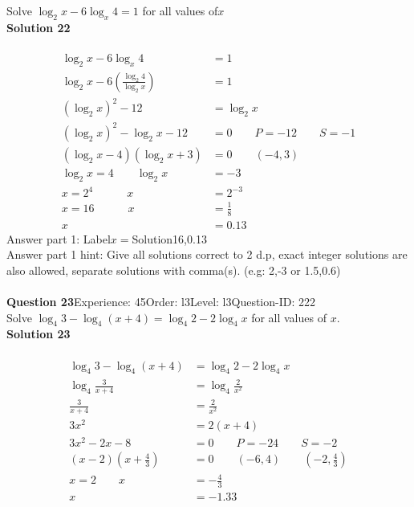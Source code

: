 \documentclass{article}
\begin{document}
Solve $\log_{2}x-6\log_{x}4=1$ for all values of$x$\\[4pt]
\noindent\textbf{Solution 22}\\[2pt]
\\[-35pt]\begin{align*}
\log_{2}x-6\log_{x}4&=1\\[2pt]
\log_{2}x-6\left(\displaystyle\frac{\log_{2}4}{\log_{2}x}\right)&=1\\[2pt]
(\log_{2}x)^2-12&=\log_{2}x\\[2pt]
(\log_{2}x)^2-\log_{2}x-12&=0\qquad P=-12 \qquad S=-1\\[2pt]
(\log_{2}x-4)(\log_{2}x+3)&=0\qquad (-4,3)\\[2pt]
\log_{2}x=4 \qquad \log_{2}x&=-3\\[2pt]
x=2^4 \hspace{36pt} x&=2^{-3}\\[2pt]
x=16 \hspace{36pt} x&=\displaystyle\frac{1}{8}\\[2pt]
x&=0.13
\end{align*}
Answer part 1: \hspace{10pt}Label\hspace{10pt}$x=$\hspace{10pt}Solution\hspace{10pt}16,0.13\\
Answer part 1 hint: \hspace{15pt}Give all solutions correct to 2 d.p, exact integer solutions are also allowed, separate solutions with comma(s). (e.g: 2,-3 or 1.5,0.6)\\
\\[4pt]
\noindent\textbf{Question 23}\hspace{20pt}Experience: 45\hspace{20pt}Order: l3\hspace{20pt}Level: l3\hspace{20pt}Question-ID: 222\\[2pt]
Solve $\log_{4}3-\log_{4}(x+4)=\log_{4}2-2\log_{4}x$ for all values of $x$.\\[4pt]
\noindent\textbf{Solution 23}\\[2pt]
\\[-35pt]\begin{align*}
\log_{4}3-\log_{4}(x+4)&=\log_{4}2-2\log_{4}x\\[2pt]
\log_{4}\displaystyle\frac{3}{x+4}&=\log_{4}\displaystyle\frac{2}{x^2}\\[2pt]
\displaystyle\frac{3}{x+4}&=\displaystyle\frac{2}{x^2}\\[2pt]
3x^2&=2(x+4)\\[2pt]
3x^2-2x-8&=0\qquad P=-24\qquad S=-2\\[2pt]
(x-2)\left(x+\displaystyle\frac{4}{3}\right)&=0\qquad (-6,4)\qquad \left(-2,\displaystyle\frac{4}{3}\right)\\[2pt]
x=2\qquad x&=-\displaystyle\frac{4}{3}\\[2pt]
x&=-1.33
\end{align*}
\end{document}
